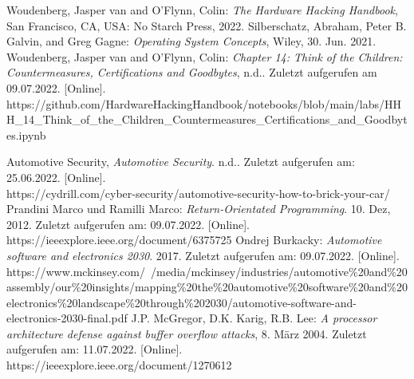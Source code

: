 \documentclass[a4paper,
DIV=13,
12pt,
BCOR=10mm,
department=FakIM,
oneside,
parskip=half,
automark,
listof=totocnumbered,
bibliography=totocnumbered,
acronym=totocnumbered
] {OTHRartcl}
\begin{document}
\begin{appendix}
\newpage
\listoffigures

\cleardoublepage
\newpage

\begin{thebibliography}{99}
 Woudenberg, Jasper van and O'Flynn, Colin: \textit{The Hardware Hacking Handbook}, San Francisco, CA, USA: No Starch Press, 2022.
 Silberschatz, Abraham, Peter B. Galvin, and Greg Gagne: \textit{Operating System Concepts}, Wiley, 30. Jun. 2021.
 Woudenberg, Jasper van and O'Flynn, Colin: \textit{Chapter 14: Think of the Children: Countermeasures, Certifications and Goodbytes}, n.d.. Zuletzt aufgerufen am 09.07.2022. [Online]. https://github.com/HardwareHackingHandbook/notebooks/blob/main/labs/HHH\_14\_Think\_of\_the\_Children\_Countermeasures\_Certifications\_and\_Goodbytes.ipynb



 Automotive Security, \textit{Automotive Security}. n.d.. Zuletzt aufgerufen am: 25.06.2022. [Online]. \\https://cydrill.com/cyber-security/automotive-security-how-to-brick-your-car/ %
 Prandini Marco und Ramilli Marco: \textit{Return-Orientated Programming}. 10. Dez, 2012. Zuletzt aufgerufen am: 09.07.2022. [Online]. https://ieeexplore.ieee.org/document/6375725
  Ondrej Burkacky: \textit{Automotive software and electronics 2030}. 2017. Zuletzt aufgerufen am: 09.07.2022. [Online]. https://www.mckinsey.com/~/media/mckinsey/industries/automotive\%20and\%20assembly/our\%20insights/mapping\%20the\%20automotive\%20software\%20and\%20electronics\%20landscape\%20through\%202030/automotive-software-and-electronics-2030-final.pdf
 J.P. McGregor, D.K. Karig, R.B. Lee: \textit{A processor architecture defense against buffer overflow attacks}, 8. März 2004. Zuletzt aufgerufen am: 11.07.2022. [Online]. https://ieeexplore.ieee.org/document/1270612




\end{thebibliography}
\end{appendix}
\end{document}
